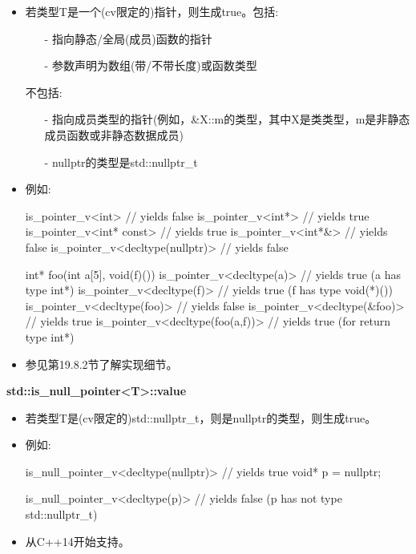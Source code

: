 \begin{itemize}
\item 
若类型T是一个(cv限定的)指针，则生成true。包括:
\begin{itemize}

\item[-] 
指向静态/全局(成员)函数的指针

\item[-] 
参数声明为数组(带/不带长度)或函数类型
\end{itemize}

不包括:

\begin{itemize}
\item[-] 
指向成员类型的指针(例如，\&X::m的类型，其中X是类类型，m是非静态成员函数或非静态数据成员)

\item[-] 
nullptr的类型是std::nullptr\_t
\end{itemize}

\item 
例如:

\begin{cpp}
is_pointer_v<int> // yields false
is_pointer_v<int*> // yields true
is_pointer_v<int* const> // yields true
is_pointer_v<int*&> // yields false
is_pointer_v<decltype(nullptr)> // yields false

int* foo(int a[5], void(f)())
{
	is_pointer_v<decltype(a)> // yields true (a has type int*)
	is_pointer_v<decltype(f)> // yields true (f has type void(*)())
	is_pointer_v<decltype(foo)> // yields false
	is_pointer_v<decltype(&foo)> // yields true
	is_pointer_v<decltype(foo(a,f))> // yields true (for return type int*)
}
\end{cpp}

\item 
参见第19.8.2节了解实现细节。
\end{itemize}

\textbf{std::is\_null\_pointer<T>::value}

\begin{itemize}
\item 
若类型T是(cv限定的)std::nullptr\_t，则是nullptr的类型，则生成true。

\item 
例如:
\begin{cpp}
is_null_pointer_v<decltype(nullptr)> // yields true
void* p = nullptr;

is_null_pointer_v<decltype(p)> // yields false (p has not type std::nullptr_t)
\end{cpp}

\item 
从C++14开始支持。
\end{itemize}

